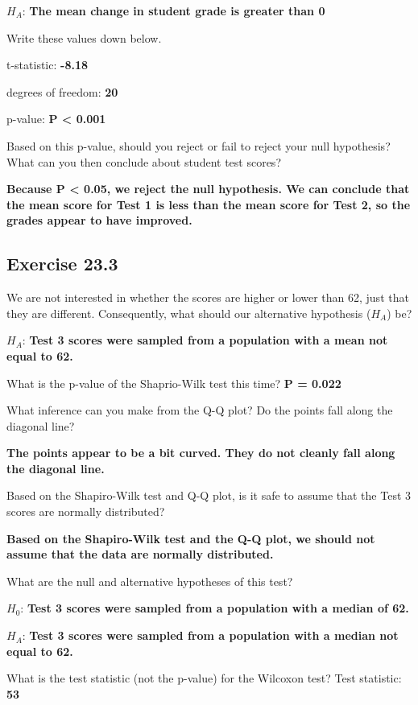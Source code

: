 \documentclass[
]{scrbook}
\begin{document}
\(H_{A}\): \textbf{The mean change in student grade is greater than 0}

Write these values down below.

t-statistic: \textbf{-8.18}

degrees of freedom: \textbf{20}

p-value: \textbf{P \textless{} 0.001}

Based on this p-value, should you reject or fail to reject your null hypothesis? What can you then conclude about student test scores?

\textbf{Because P \textless{} 0.05, we reject the null hypothesis. We can conclude that the mean score for Test 1 is less than the mean score for Test 2, so the grades appear to have improved.}

\hypertarget{exercise-23.3}{%
\subsection{Exercise 23.3}\label{exercise-23.3}}

We are not interested in whether the scores are higher or lower than 62, just that
they are different. Consequently, what should our alternative hypothesis (\(H_{A}\)) be?

\(H_{A}\): \textbf{Test 3 scores were sampled from a population with a mean not equal to 62.}

What is the p-value of the Shaprio-Wilk test this time? \textbf{P = 0.022}

What inference can you make from the Q-Q plot? Do the points fall along the diagonal line?

\textbf{The points appear to be a bit curved. They do not cleanly fall along the diagonal line.}

Based on the Shapiro-Wilk test and Q-Q plot, is it safe to assume that the Test 3 scores are normally distributed?

\textbf{Based on the Shapiro-Wilk test and the Q-Q plot, we should not assume that the data are normally distributed.}

What are the null and alternative hypotheses of this test?

\(H_{0}\): \textbf{Test 3 scores were sampled from a population with a median of 62.}

\(H_{A}\): \textbf{Test 3 scores were sampled from a population with a median not equal to 62.}

What is the test statistic (not the p-value) for the Wilcoxon test? Test statistic: \textbf{53}
\end{document}
